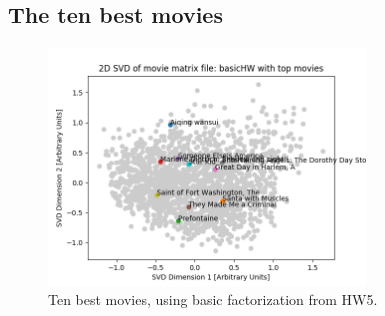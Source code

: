 \subsection{The ten best movies}    
    \begin{figure}[H]
    \centering
    \includegraphics[width=0.75\textwidth]{../Figures/fig3.png}
    \caption{Ten best movies, using basic factorization from HW5.}
    \end{figure}


